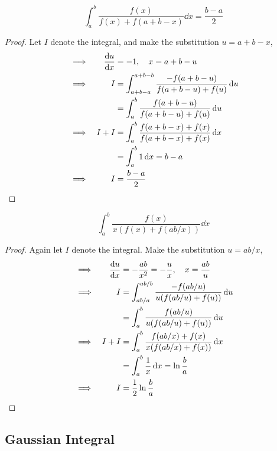 \begin{theorem}
\begin{equation*}
\int_a^b \frac{f(x)}{f(x) + f(a + b - x)} \dd{x} = \frac{b - a} 2
\end{equation*}
\end{theorem}
\begin{proof}
Let \(I\) denote the integral, and make the substitution \(u = a + b - x\),
\begin{alignat*}{2}
&\implies& \dv{u}{x} &= -1, \quad x = a + b - u \\
&\implies& I &= \int_{a + b - a}^{a + b - b}
                    \frac{-f(a + b - u)}{f(a + b - u) + f(u)} \dd{u} \\
&&  &= \int_a^b \frac{f(a + b - u)}{f(a + b - u) + f(u)} \dd{u} \\
&\implies& I + I &= \int_a^b
                    \frac{f(a + b - x) + f(x)}
                         {f(a + b - x) + f(x)} \dd{x} \\
&&  &= \int_a^b 1 \dd{x} = b - a \\
&\implies& I &= \frac{b - a} 2 \tag*{\qedhere}
\end{alignat*}
\end{proof}
\begin{theorem}
\begin{equation*}
\int_a^b \frac{f(x)}{x(f(x) + f(ab / x))} \dd{x}
\end{equation*}
\end{theorem}
\begin{proof}
Again let \(I\) denote the integral. Make the substitution \(u = ab / x\),
\begin{alignat*}{2}
&\implies& \dv{u}{x} &= -\frac{ab}{x^2} = -\frac ux, \quad x = \frac{ab}u \\
&\implies& I &= \int_{ab/a}^{ab/b} \frac{-f(ab / u)}{u(f(ab / u) + f(u))}
    \dd{u} \\
&& &= \int_a^b \frac{f(ab / u)}{u(f(ab / u) + f(u))} \dd{u} \\
&\implies& I + I &= \int_a^b \frac{f(ab / x) + f(x)}
                                  {x(f(ab / x) + f(x))} \dd{x} \\
&& &= \int_a^b \frac 1x \dd{x} = \ln \frac ba \\
&\implies& I &= \frac 12 \ln \frac ba \tag*{\qedhere}
\end{alignat*}
\end{proof}

\subsection{Gaussian Integral}

